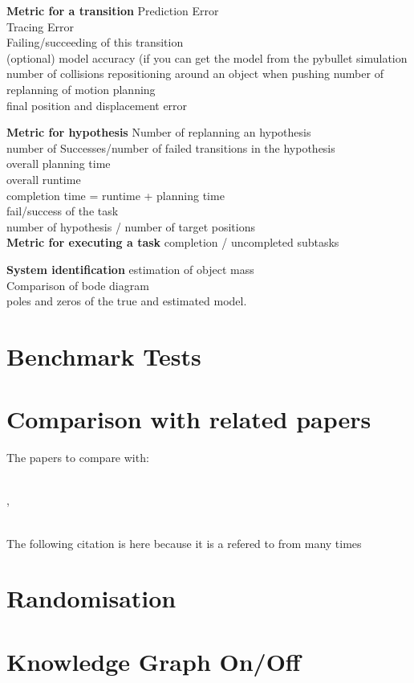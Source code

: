 
\textbf{Metric for a transition}
\newline
Prediction Error\\
Tracing Error\\
Failing/succeeding of this  transition\\
(optional) model accuracy (if you can get the model from the pybullet simulation
number of collisions
repositioning around an object when pushing
number of replanning of motion planning\\
final position and displacement error\\


\textbf{Metric for hypothesis}
\newline
Number of replanning an hypothesis\\
number of Successes/number of failed transitions in the hypothesis\\
overall planning time\\
overall runtime\\
completion time = runtime + planning time\\
fail/success of the task\\
number of hypothesis / number of target positions\\

\textbf{Metric for executing a task}
completion / uncompleted subtasks


\textbf{System identification}
\newline
estimation of object mass\\
Comparison of bode diagram\\
poles and zeros of the true and estimated model.\\


\newpage
\section{Benchmark Tests}
\section{Comparison with related papers}
The papers to compare with:\newline

\\

\cite{sabbaghnovin_model_2021}, 


\\
\cite{novin_dynamic_2018}
The following \cite{novin_dynamic_2018} citation is here because it is a refered to from \cite{sabbaghnovin_model_2021} many times
\section{Randomisation}
\section{Knowledge Graph On/Off}
